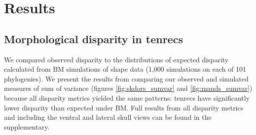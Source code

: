 \documentclass[12pt,a4paper]{article}
\begin{document}

\section{Results}

\subsection{Morphological disparity in tenrecs} 



We compared observed disparity to the distributions of expected disparity calculated from BM simulations of shape data (1,000 simulations on each of 101 phylogenies). We present the results from comparing our observed and simulated measures of sum of variance (figures \ref{fig:skdors_sumvar} and \ref{fig:mands_sumvar}) because all disparity metrics yielded the same patterns: tenrecs have significantly lower disparity than expected under BM.  Full results from all disparity metrics and including the ventral and lateral skull views can be found in the supplementary.

\end{document}
